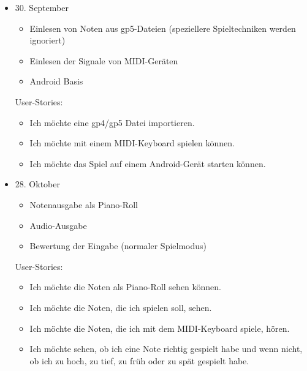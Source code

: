 \documentclass[12pt,a4paper]{report}
\begin{document}
    \begin{itemize}
    \item 30. September
      \begin{itemize}
      \item Einlesen von Noten aus gp5-Dateien (speziellere Spieltechniken werden ignoriert)
      \item Einlesen der Signale von MIDI-Geräten
      \item Android Basis
      \end{itemize}
	  User-Stories:
	    \begin{itemize}
	    \item[P] Ich möchte eine gp4/gp5 Datei importieren.
	    \item[P] Ich möchte mit einem MIDI-Keyboard spielen können.
	    \item[P] Ich möchte das Spiel auf einem Android-Gerät starten können.
	    \end{itemize}
      
    \item 28. Oktober
      \begin{itemize}
      \item Notenausgabe als Piano-Roll
      \item Audio-Ausgabe
      \item Bewertung der Eingabe (normaler Spielmodus)
      \end{itemize}
      User-Stories:
      \begin{itemize}
      \item[P] Ich möchte die Noten als Piano-Roll sehen können.
      \item[P] Ich möchte die Noten, die ich spielen soll, sehen.
      \item[P] Ich möchte die Noten, die ich mit dem MIDI-Keyboard spiele, hören.
	  \item[P] Ich möchte sehen, ob ich eine Note richtig gespielt habe und wenn nicht, ob ich zu hoch, zu tief, zu früh oder zu spät gespielt habe.
      \end{itemize}
      

\end{itemize}
\end{document}
